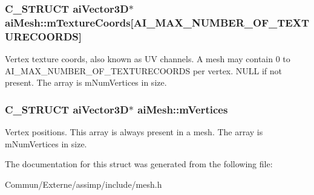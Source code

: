 \subsubsection[{\texorpdfstring{m\+Texture\+Coords}{mTextureCoords}}]{\setlength{\rightskip}{0pt plus 5cm}C\+\_\+\+S\+T\+R\+U\+CT {\bf ai\+Vector3D}$\ast$ ai\+Mesh\+::m\+Texture\+Coords\mbox{[}A\+I\+\_\+\+M\+A\+X\+\_\+\+N\+U\+M\+B\+E\+R\+\_\+\+O\+F\+\_\+\+T\+E\+X\+T\+U\+R\+E\+C\+O\+O\+R\+DS\mbox{]}}\hypertarget{structai_mesh_a4a50b11d00ef50f419c75cab0f6bddd6}{}\label{structai_mesh_a4a50b11d00ef50f419c75cab0f6bddd6}
Vertex texture coords, also known as UV channels. A mesh may contain 0 to A\+I\+\_\+\+M\+A\+X\+\_\+\+N\+U\+M\+B\+E\+R\+\_\+\+O\+F\+\_\+\+T\+E\+X\+T\+U\+R\+E\+C\+O\+O\+R\+DS per vertex. N\+U\+LL if not present. The array is m\+Num\+Vertices in size. 
\subsubsection[{\texorpdfstring{m\+Vertices}{mVertices}}]{\setlength{\rightskip}{0pt plus 5cm}C\+\_\+\+S\+T\+R\+U\+CT {\bf ai\+Vector3D}$\ast$ ai\+Mesh\+::m\+Vertices}\hypertarget{structai_mesh_afd4588abb3e1c72821ae0234a3850662}{}\label{structai_mesh_afd4588abb3e1c72821ae0234a3850662}
Vertex positions. This array is always present in a mesh. The array is m\+Num\+Vertices in size. 

The documentation for this struct was generated from the following file\+:\begin{DoxyCompactItemize}
\item 
Commun/\+Externe/assimp/include/mesh.\+h\end{DoxyCompactItemize}
